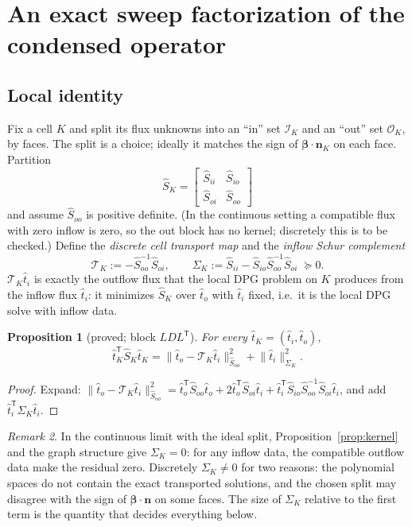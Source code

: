 \documentclass[11pt]{article}
\newtheorem{proposition}{Proposition}
\theoremstyle{remark}
\newtheorem{remark}[proposition]{Remark}
\theoremstyle{definition}
\newcommand{\bbeta}{\boldsymbol{\beta}}
\newcommand{\bn}{\boldsymbol{n}}
\newcommand{\that}{\hat{t}}
\newcommand{\Shat}{\widehat{S}}
\newcommand{\T}{\mathsf{T}}
\newcommand{\Tr}{\mathcal{T}}
\begin{document}
\section{An exact sweep factorization of the condensed operator}

\subsection{Local identity}

Fix a cell $K$ and split its flux unknowns into an ``in'' set $\mathcal I_K$ and an ``out'' set $\mathcal O_K$, by
faces.  The split is a choice; ideally it matches the sign of $\bbeta\cdot\bn_K$ on each face.  Partition
\[
  \Shat_K = \begin{bmatrix}\Shat_{ii} & \Shat_{io}\\ \Shat_{oi} & \Shat_{oo}\end{bmatrix}
\]
and assume $\Shat_{oo}$ is positive definite.  (In the continuous setting a compatible flux with zero inflow is zero,
so the out block has no kernel; discretely this is to be checked.)  Define the \emph{discrete cell transport map} and
the \emph{inflow Schur complement}
\[
  \Tr_K := -\Shat_{oo}^{-1}\Shat_{oi},\qquad \Sigma_K := \Shat_{ii}-\Shat_{io}\Shat_{oo}^{-1}\Shat_{oi}\;\succeq 0 .
\]
$\Tr_K\that_i$ is exactly the outflow flux that the local DPG problem on $K$ produces from the inflow flux $\that_i$:
it minimizes $\Shat_K$ over $\that_o$ with $\that_i$ fixed, i.e.\ it is the local DPG solve with inflow data.

\begin{proposition}[proved; block $LDL^\T$]\label{prop:local}
For every $\that_K=(\that_i,\that_o)$,
\[
  \that_K^\T\Shat_K\that_K = \bigl\|\that_o-\Tr_K\that_i\bigr\|^2_{\Shat_{oo}} + \bigl\|\that_i\bigr\|^2_{\Sigma_K}.
\]
\end{proposition}
\begin{proof}
Expand: $\|\that_o-\Tr_K\that_i\|^2_{\Shat_{oo}} = \that_o^\T\Shat_{oo}\that_o + 2\that_o^\T\Shat_{oi}\that_i
+ \that_i^\T\Shat_{io}\Shat_{oo}^{-1}\Shat_{oi}\that_i$, and add $\that_i^\T\Sigma_K\that_i$.
\end{proof}

\begin{remark}
In the continuous limit with the ideal split, Proposition~\ref{prop:kernel} and the graph structure give
$\Sigma_K=0$: for any inflow data, the compatible outflow data make the residual zero.  Discretely $\Sigma_K\ne0$ for
two reasons: the polynomial spaces do not contain the exact transported solutions, and the chosen split may disagree
with the sign of $\bbeta\cdot\bn$ on some faces.  The size of $\Sigma_K$ relative to the first term is the quantity
that decides everything below.
\end{remark}
\end{document}
